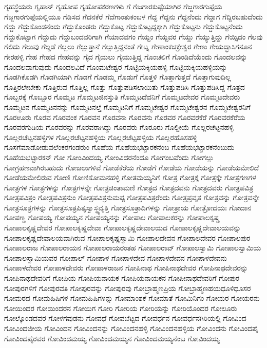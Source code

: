 {ಗೃಹಸ್ಥೆಯರು
ಗೃಹಾನ್
ಗೃಹೋಪ
ಗೃಹೋಪಕರಣಗಳು
ಗೆ
ಗೆಜಗಾರಕುಪ್ಪೆಯಾಗಿರ
ಗೆಜ್ಜಗಾರಗುಪ್ಪೆಯ
ಗೆಜ್ಜಗಾರಗುಪ್ಪೆಯಲ್ಲಿಯೂ
ಗೆಡಿಸದ
ಗೆದನಕೆರೆ
ಗೆದೆಗಾಂತುಕಂಬಳ
ಗೆದ್ದ
ಗೆದ್ದನು
ಗೆದ್ದನೆಂದು
ಗೆದ್ದಾಗ
ಗೆದ್ದಿರಬಹುದೆಂದು
ಗೆದ್ದು
ಗೆದ್ದುಕೊಂಡನೆಂದು
ಗೆದ್ದುಕೊಂಡರು
ಗೆದ್ದುಕೊಟ್ಟ
ಗೆದ್ದುಕೊಟ್ಟದ್ದಕ್ಕಾಗಿ
ಗೆದ್ದುಕೊಟ್ಟನು
ಗೆದ್ದುಕೊಟ್ಟನೆಂದು
ಗೆದ್ದುಕೊಟ್ಟಾಗ
ಗೆದ್ದುದು
ಗೆದ್ದುಬಂದವರಿಗಾಗಿ
ಗೆಯಾದವಗಂ
ಗೆಯ್ದಂ
ಗೆಯ್ದವರ
ಗೆಯ್ದು
ಗೆಯ್ಯುತ್ತಿದ್ದು
ಗೆಯ್ಸಿದಂ
ಗೆಲವು
ಗೆಲಿದು
ಗೆಲುವು
ಗೆಲ್ದಡೆ
ಗೆಲ್ಲಲು
ಗೆಲ್ಲುತ್ತಾನೆ
ಗೆಲ್ಲುತ್ತಿದ್ದನಂತೆ
ಗೇಟ್ನ
ಗೇಣಾಂಕಚಕ್ರೇಶ್ವರ
ಗೇಣು
ಗೇಯದ್ಭಾಸಿಗನೂನ
ಗೇರಹಳ್ಳಿ
ಗೇಹ
ಗೇಹದ
ಗೇಹವನ್ನು
ಗೈದ
ಗೈಯಲು
ಗೈಯುತ್ತಿದ್ದ
ಗೊಂಚಲಿಗೆ
ಗೊಂಡಿದೆಯೆಂದು
ಗೊಂದಲವನ್ನು
ಗೊಂದಲವಾಗುವುದು
ಗೊಂದಲವಿದೆ
ಗೊಂಮಟೇಶ್ವರ
ಗೊಟ್ಟಿಯಕ್ಕಿಯಹಳ್ಳಿ
ಗೊಟ್ಟಿಯಕ್ಕಿಯಹಳ್ಳಿಯನ್ನು
ಗೊಡಗಿಕೊಡಗಿ
ಗೊಡಗಿಯಾಗಿ
ಗೊಡಗೆ
ಗೊಡಮ್ಮ
ಗೊಡುಗೆ
ಗೊತ್ತಳಿ
ಗೊತ್ತಾಗುತ್ತದೆ
ಗೊತ್ತಾಗುವುದಿಲ್ಲ
ಗೊತ್ತಿರಲೇಬೇಕು
ಗೊತ್ತಿರುವ
ಗೊತ್ತಿಲ್ಲ
ಗೊತ್ತು
ಗೊತ್ತುಪಡಿಸಲಾಯಿತು
ಗೊತ್ತುಪಡಿಸಿ
ಗೊತ್ತುಪಡಿಸಿದ್ದ
ಗೊತ್ರದ
ಗೊಬ್ಬರಕ್ಕೆ
ಗೊಬ್ಬೂರ
ಗೊಮ್ಮಟ
ಗೊಮ್ಮಟಜಿನಸ್ತುತಿ
ಗೊಮ್ಮಟದೆವನಿಗೆ
ಗೊಮ್ಮಟದೇವರ
ಗೊಮ್ಮಟದೇವರು
ಗೊಮ್ಮಟನ
ಗೊಮ್ಮಟನನನ್ನು
ಗೊಮ್ಮಟನಲ್ತೆ
ಗೊಮ್ಮಟನಿಗೆ
ಗೊಮ್ಮಟೇಶ್ವರ
ಗೊಮ್ಮಟೇಶ್ವರನ
ಗೊಮ್ಮಟೇಶ್ವರನಿಗೆ
ಗೊರಊರು
ಗೊರವ
ಗೊರವಂಕ
ಗೊರವನ
ಗೊರವನಾ
ಗೊರವನು
ಗೊರವರ
ಗೊರವರಕೆರೆ
ಗೊರವರಕೆರೆಯ
ಗೊರವರಗುಡಿಯ
ಗೊರವರನ್ನು
ಗೊರವರಾಗಿದ್ದು
ಗೊರವರು
ಗೊರೂರು
ಗೊಲ್ದೀಯೆ
ಗೊಲ್ಲರಚೆಟ್ಟನಹಳ್ಳಿ
ಗೊಲ್ಲರಚೆಟ್ಟನಹಳ್ಳಿಗಳ
ಗೊಲ್ಲರಚೆಟ್ಟನಹಳ್ಳಿಯ
ಗೊಲ್ಲರಚೆಟ್ಟಹಳ್ಳಿಯ
ಗೊಲ್ಲರಹೊಸಹಳ್ಳಿ
ಗೊಸಗೆಮಾಡೋಡುವಲೆಂಕರಗಂಡರುಂ
ಗೊಹೆಯ
ಗೊಹೆಯಭಟ್ಟಾರಕನೆಂಬ
ಗೊಹೆಯಭಟ್ಟಾರಕನೆಂಬುದು
ಗೊಹೆಯಭಟ್ಟಾರಕನ್
ಗೋ
ಗೋಂವಿಂದಯ್ಯ
ಗೋಂವಿದರನೆಂದೂ
ಗೋಗಂಬವೆಂದು
ಗೋಗಲ್ಲು
ಗೋಗ್ರಹಣವಾಗಿರಬಹುದು
ಗೋಜಲುಗಳಿವೆ
ಗೋಡೆಕೆರೆಯ
ಗೋಡೆಗೆ
ಗೋಡೆಯ
ಗೋಡೆಯನ್ನು
ಗೋಡೆಯಮೇಲಿದೆ
ಗೋಡೆಯಮೇಲಿರುವ
ಗೋಣಿ
ಗೋಣಿಸೋಮನಹಳ್ಳಿ
ಗೋತಮಯ್ಯನಿಗೆ
ಗೋತ್ರ
ಗೋತ್ರಕ್ಕೆ
ಗೋತ್ರಕ್ಕೇ
ಗೋತ್ರಗಣಗಳ
ಗೋತ್ರಗಳ
ಗೋತ್ರಗಳನ್ನು
ಗೋತ್ರಗಳನ್ನೇ
ಗೋತ್ರಚಿಂತಾಮಣಿ
ಗೋತ್ರದ
ಗೋತ್ರದವನು
ಗೋತ್ರದವರು
ಗೋತ್ರಪವಿತ್ರ
ಗೋತ್ರಪವಿತ್ರಂ
ಗೋತ್ರಪವಿತ್ರನುಂ
ಗೋತ್ರಪವಿತ್ರನುಮಪ್ಪ
ಗೋತ್ರಪವಿತ್ರರೆಂದು
ಗೋತ್ರಪ್ರವೃತ
ಗೋತ್ರವನ್ನು
ಗೋತ್ರವನ್ನೇ
ಗೋತ್ರಸೂತ್ರಗಳನ್ನು
ಗೋತ್ರಸೂತ್ರಪಿತೃಸ್ವಾಸ್ಥ್ಯವೃತ್ತಿ
ಗೋತ್ರಸೂತ್ರಾದಿಗಳನ್ನು
ಗೋತ್ರಾಯ
ಗೋತ್ರೋದಯಃ
ಗೋದಾನ
ಗೋಪಣ್ಣ
ಗೋಪಯ್ಯ
ಗೋಪಯ್ಯನ
ಗೋಪಯ್ಯನನ್ನು
ಗೋಪಾಲ
ಗೋಪಾಲಕರನ್ನು
ಗೋಪಾಲಕೃಷ್ಣ
ಗೋಪಾಲಕೃಷ್ಣದೇವರ
ಗೋಪಾಲಕೃಷ್ಣದೇವಾ
ಗೋಪಾಲಕೃಷ್ಣದೇವಾಲಯದ
ಗೋಪಾಲಕೃಷ್ಣದೇವಾಲಯವನ್ನು
ಗೋಪಾಲಕೃಷ್ಣದೇವಾಲಯವಾಗಿರುವ
ಗೋಪಾಲಕೃಷ್ಣಸ್ವಾಮಿ
ಗೋಪಾಲದೇವನ
ಗೋಪಾಲದೇವರ
ಗೋಪಾಲಪುರ
ಗೋಪಾಲರಾಜ
ಗೋಪಾಲರಾಯನ
ಗೋಪಾಲರಾಯರಂತಹ
ಗೋಪಾಲರಾವ್
ಗೋಪಾಲಸ್ವಾಮಿ
ಗೋಪಾಲಸ್ವಾಮಿಯ
ಗೋಪಾಲಸ್ವಾಮಿಯವರ
ಗೋಪಾಲ್
ಗೋಪಾಳ
ಗೋಪಾಳದೇವ
ಗೋಪಾಳದೇವನ
ಗೋಪಾಳದೇವನು
ಗೋಪಾಳದೇವರ
ಗೋಪಾಳದೇವರು
ಗೋಪಾಳರಾಜನ
ಗೋಪಿನಾಥ
ಗೋಪಿನಾಥದೇವರ
ಗೋಪಿನಾಥದೇವರನ್ನು
ಗೋಪಿನಾಥದೇವರಿಗೆ
ಗೋಪಿಯ
ಗೋಪಿಯನಾಯಕ
ಗೋಪಿಯನಾಯಕನ
ಗೋಪೀನಾಥದೇವರಿಗೆ
ಗೋಪುರ
ಗೋಪುರಗಳಿಗೆ
ಗೋಪುರವತಿ
ಗೋಪುರವನ್ನು
ಗೋಪುರವು
ಗೋಬ್ರಾಹ್ಮಣಪ್ರಿಯ
ಗೋಬ್ರಾಹ್ಮಣಹಯಧೂಳಿಧೂಸರ
ಗೋಮಠದ
ಗೋಮಹಿಷಿಗಳ
ಗೋಮಹಿಷಿಗಳನ್ನು
ಗೋಮಾಂಶಕೆ
ಗೋಮಾತೆ
ಗೋಮಿನಿಗಂ
ಗೋಯರ
ಗೋಯರನು
ಗೋಯಿಂದರ
ಗೋಯಿಂದರನ
ಗೋಯಿಗ
ಗೋರಿ
ಗೋರಿಯ
ಗೋರಿಯನ್ನು
ಗೋರಿಯೊಂದರ
ಗೋಲೂರು
ಗೋಲ್ಕೊಂಡದವರ
ಗೋಳಗವುಡನು
ಗೋವಧೆ
ಗೋವಬೆಟ್ಟದ
ಗೋವರ್ಧನ
ಗೋವರ್ಧನಗಿರಿಯಲ್ಲಿ
ಗೋವಿಂದ
ಗೋವಿಂದಜೀಯ
ಗೋವಿಂದನ
ಗೋವಿಂದನನ್ನು
ಗೋವಿಂದನಹಳ್ಳಿ
ಗೋವಿಂದನಹಳ್ಳಿಯ
ಗೋವಿಂದನು
ಗೋವಿಂದಪೈ
ಗೋವಿಂದಪೈರವರ
ಗೋವಿಂದಮಯ್ಯ
ಗೋವಿಂದಮಯ್ಯನ
ಗೋವಿಂದಮಯ್ಯನೆಂಬ
ಗೋವಿಂದಯ್ಯ
}
